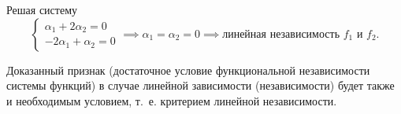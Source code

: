 \documentclass[../../main.tex]{subfiles}
\begin{document}
\begin{exmps}
\begin{enumerate}
		Решая систему
		\[ \begin{cases}
		\alpha_1 + 2\alpha_2 = 0 \\
		-2\alpha_1 + \alpha_2 = 0
		\end{cases} \implies \alpha_1 = \alpha_2 = 0 \implies
		\text{линейная независимость $f_1 \text{ и } f_2$.}
		\]
	\end{enumerate}
\end{exmps}

\begin{rem}
	\;
	
	Доказанный признак (достаточное условие функциональной 
	независимости системы функций) 
	в случае линейной зависимости (независимости) будет также и 
	необходимым условием, т.~е. критерием линейной независимости.
\end{rem}
\end{document}
